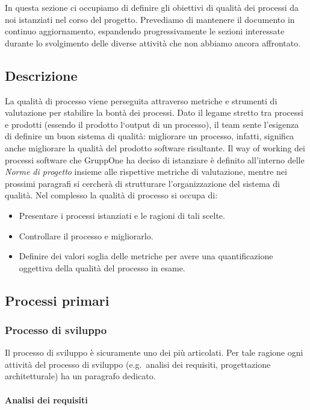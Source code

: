 \documentclass[../piano-di-qualifica.tex]{subfiles}
\begin{document}
In questa sezione ci occupiamo di definire gli obiettivi di qualità dei processi da noi istanziati nel corso del progetto.
Prevediamo di mantenere il documento in continuo aggiornamento, espandendo progressivamente le sezioni interessate durante lo svolgimento delle diverse attività che non abbiamo ancora affrontato.

\subsection{Descrizione}%
\label{sub:descrizione}

La qualità di processo viene perseguita attraverso metriche e strumenti di valutazione per stabilire la bontà dei processi.
Dato il legame stretto tra processi e prodotti (essendo il prodotto l`output di un processo), il team sente l'esigenza di definire un buon sistema di qualità: migliorare un processo, infatti, significa anche migliorare la qualità del prodotto software risultante.
Il way of working dei processi software che GruppOne ha deciso di istanziare è definito all'interno delle \textit{Norme di progetto} insieme alle rispettive metriche di valutazione, mentre nei prossimi paragrafi si cercherà di strutturare l'organizzazione del sistema di qualità.
Nel complesso la qualità di processo si occupa di:
\begin{itemize}
  \item Presentare i processi istanziati e le ragioni di tali scelte.
  \item Controllare il processo e migliorarlo.
  \item Definire dei valori soglia delle metriche per avere una quantificazione oggettiva della qualità del processo in esame.
\end{itemize}

\subsection{Processi primari}%
\label{sub:processi_primari}

\subsubsection{Processo di sviluppo}%
\label{subs:processo_di_sviluppo}
Il processo di sviluppo è sicuramente uno dei più articolati. Per tale ragione ogni attività del processo di sviluppo (e.g.\ analisi dei requisiti, progettazione architetturale) ha un paragrafo dedicato.

\paragraph{Analisi dei requisiti}%
\label{par:analisi_dei_requisiti}
\end{document}
